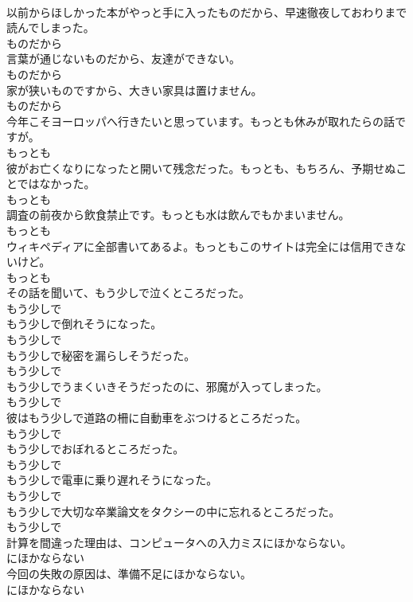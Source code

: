 \documentclass[8pt]{extreport}
\begin{document}
\begin{CJK}{UTF8}{min}
\\	以前からほしかった本がやっと手に入ったものだから、早速徹夜しておわりまで読んでしまった。	
\\	ものだから	
\\	言葉が通じないものだから、友達ができない。	
\\	ものだから	
\\	家が狭いものですから、大きい家具は置けません。	
\\	ものだから	
\\	今年こそヨーロッパへ行きたいと思っています。もっとも休みが取れたらの話ですが。	
\\	もっとも	
\\	彼がお亡くなりになったと開いて残念だった。もっとも、もちろん、予期せぬことではなかった。	
\\	もっとも	
\\	調査の前夜から飲食禁止です。もっとも水は飲んでもかまいません。	
\\	もっとも	
\\	ウィキペディアに全部書いてあるよ。もっともこのサイトは完全には信用できないけど。	
\\	もっとも	
\\	その話を聞いて、もう少しで泣くところだった。	
\\	もう少しで	
\\	もう少しで倒れそうになった。	
\\	もう少しで	
\\	もう少しで秘密を漏らしそうだった。	
\\	もう少しで	
\\	もう少しでうまくいきそうだったのに、邪魔が入ってしまった。	
\\	もう少しで	
\\	彼はもう少しで道路の柵に自動車をぶつけるところだった。	
\\	もう少しで	
\\	もう少しでおぼれるところだった。	
\\	もう少しで	
\\	もう少しで電車に乗り遅れそうになった。	
\\	もう少しで	
\\	もう少しで大切な卒業論文をタクシーの中に忘れるところだった。	
\\	もう少しで	
\\	計算を間違った理由は、コンピュータへの入力ミスにほかならない。	
\\	にほかならない	
\\	今回の失敗の原因は、準備不足にほかならない。	
\\	にほかならない	

\end{CJK}
\end{document}
